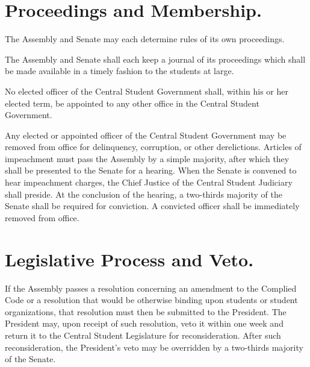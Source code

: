 \section{Proceedings and Membership.}
    The Assembly and Senate may each determine rules of its own proceedings.

    The Assembly and Senate shall each keep a journal of its proceedings which shall be made available in a timely fashion to the students at large.

    No elected officer of the Central Student Government shall, within his or her elected term, be appointed to any other office in the Central Student Government.

    Any elected or appointed officer of the Central Student Government may be removed from office for delinquency, corruption, or other derelictions. Articles of impeachment must pass the Assembly by a simple majority, after which they shall be presented to the Senate for a hearing. When the Senate is convened to hear impeachment charges, the Chief Justice of the Central Student Judiciary shall preside. At the conclusion of the hearing, a two-thirds majority of the Senate shall be required for conviction. A convicted officer shall be immediately removed from office.

\section{Legislative Process and Veto.}
    If the Assembly passes a resolution concerning an amendment to the Complied Code or a resolution that would be otherwise binding upon students or student organizations, that resolution must then be submitted to the President. The President may, upon receipt of such resolution, veto it within one week and return it to the Central Student Legislature for reconsideration. After such reconsideration, the President's veto may be overridden by a  two-thirds majority of the Senate.
